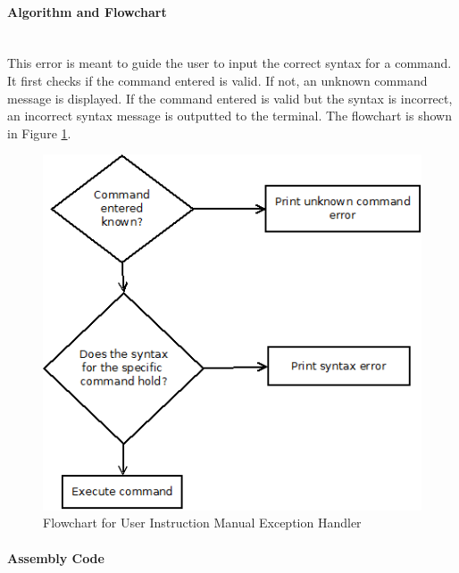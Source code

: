 \documentclass[12pt]{article}
\begin{document}
			\paragraph{Algorithm and Flowchart}~\\
			This error is meant to guide the user to input the correct syntax for a command. It first checks if the command entered is valid. If not, an unknown command message is displayed. If the command entered is valid but the syntax is incorrect, an incorrect syntax message is outputted to the terminal. The flowchart is shown in Figure \ref{fig:UserInst}.
			
		
\begin{figure}[H]
\centering
\includegraphics[width=0.7\linewidth]{UserInst}
\caption{Flowchart for User Instruction Manual Exception Handler}
\label{fig:UserInst}
\end{figure}
			\paragraph{Assembly Code}~\\
			
			
			
\end{document}
